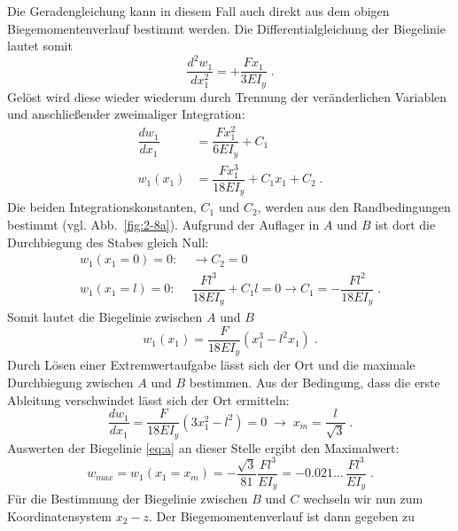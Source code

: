 \begin{example}
	Die Geradengleichung kann in diesem Fall auch direkt aus dem obigen Biegemomentenverlauf bestimmt werden.
	Die Differentialgleichung der Biegelinie lautet somit
	\begin{equation}
	\dfrac{d^2w_1}{dx_1^2}=+\dfrac{Fx_1}{3EI_y} \; .
	\end{equation}
	Gelöst wird diese wieder wiederum durch Trennung der veränderlichen Variablen und anschließender zweimaliger Integration:
	\begin{equation}
	\begin{split}
	\dfrac{dw_1}{dx_1} &= \dfrac{Fx_1^2}{6EI_y} + C_1 \\
			w_1(x_1) &= \dfrac{Fx_1^3}{18EI_y} + C_1x_1 + C_2 \; .
	\end{split}
	\end{equation}
	Die beiden Integrationskonstanten, $C_1$ und $C_2$, werden aus den Randbedingungen bestimmt (vgl. Abb.~\ref{fig:2-8a}).
	Aufgrund der Auflager in $A$ und $B$ ist dort die Durchbiegung des Stabes gleich Null:
	\begin{equation}
	\begin{split}
		w_1(x_1=0) = 0:&\; \rightarrow C_2 = 0 \\
		w_1(x_1=l) = 0:&\; \dfrac{Fl^3}{18EI_y} + C_1l = 0 \rightarrow C_1 = -\dfrac{Fl^2}{18EI_y} \; .
	\end{split}
	\end{equation}
	Somit lautet die Biegelinie zwischen $A$ und $B$
	\begin{equation}
		w_1(x_1) = \dfrac{F}{18EI_y}(x_1^3-l^2x_1) \; .
		\label{eq:a}
	\end{equation}
	Durch Lösen einer Extremwertaufgabe lässt sich der Ort und die maximale Durchbiegung zwischen $A$ und $B$ bestimmen.
	Aus der Bedingung, dass die erste Ableitung verschwindet lässt sich der Ort ermitteln:
	\begin{equation}
	\dfrac{dw_1}{dx_1} = \dfrac{F}{18EI_y}(3x_1^2-l^2) = 0 \;\rightarrow\; x_m = \dfrac{l}{\sqrt{3}} \; .
	\end{equation}
	Auswerten der Biegelinie \eqref{eq:a} an dieser Stelle ergibt den Maximalwert:
	\begin{equation}
		w_{max} = w_1(x_1=x_m) = -\dfrac{\sqrt{3}}{81}\dfrac{Fl^3}{EI_y} =-0.021...\,\dfrac{Fl^3}{EI_y}\; .
	\end{equation}
	Für die Bestimmung der Biegelinie zwischen $B$ und $C$ wechseln wir nun zum Koordinatensystem $x_2-z$.
	Der Biegemomentenverlauf ist dann gegeben zu
	\begin{equation}

\end{equation}
\end{example}
